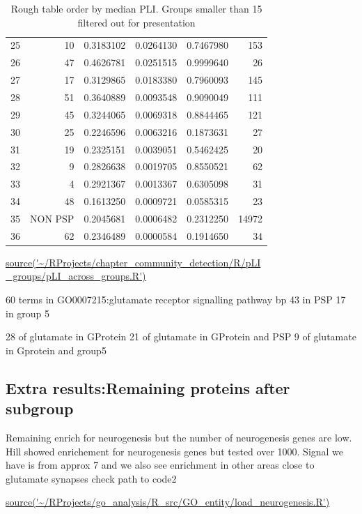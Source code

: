 \begin{table}[ht]
\begin{tabular}{lrrrrr}
  25 & 10 & 0.3183102 & 0.0264130 & 0.7467980 & 153 \\ 
  26 & 47 & 0.4626781 & 0.0251515 & 0.9999640 & 26 \\ 
  27 & 17 & 0.3129865 & 0.0183380 & 0.7960093 & 145 \\ 
  28 & 51 & 0.3640889 & 0.0093548 & 0.9090049 & 111 \\ 
  29 & 45 & 0.3244065 & 0.0069318 & 0.8844465 & 121 \\ 
  30 & 25 & 0.2246596 & 0.0063216 & 0.1873631 & 27 \\ 
  31 & 19 & 0.2325151 & 0.0039051 & 0.5462425 & 20 \\ 
  32 & 9 & 0.2826638 & 0.0019705 & 0.8550521 & 62 \\
  33 & 4 & 0.2921367 & 0.0013367 & 0.6305098 & 31 \\ 
  34 & 48 & 0.1613250 & 0.0009721 & 0.0585315 & 23 \\ 
  35 & NON PSP  & 0.2045681 & 0.0006482 & 0.2312250 & 14972 \\ 
  36 & 62 & 0.2346489 & 0.0000584 & 0.1914650 & 34 \\ 
   \hline
\end{tabular}
\caption[Spectral groups ordered by pLI]{Rough table order by median PLI. Groups smaller than 15 filtered out for presentation}
\tiny\url{source('~/RProjects/chapter_community_detection/R/pLI _groups/pLI_across_groups.R')}
\label{tab: pli across groups}
\end{table}

\clearpage

60 terms in GO0007215:glutamate receptor signalling pathway bp
43 in PSP
17 in group 5 

28 of glutamate in GProtein
21 of glutamate in GProtein and PSP
9 of glutamate in Gprotein and group5



\subsection{Extra results:Remaining proteins after subgroup}
Remaining enrich for neurogenesis but the number of neurogenesis genes are low. Hill showed enrichement for neurogenesis genes but tested over 1000. Signal we have is from approx 7 and we also see enrichment in other areas close to glutamate synapses
check path to code2

\url{source('~/RProjects/go_analysis/R_src/GO_entity/load_neurogenesis.R')}

